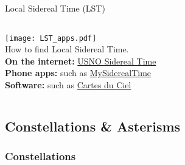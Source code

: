 
\begin{frame}{Local Sidereal Time (LST)}
  \begin{columns}[T]
    \centering
      \texttt{[image: LST\_apps.pdf]}
    \ \\[1ex]

    How to find Local Sidereal Time.\\[1.5ex]

    \textbf{On the internet:} \href{https://aa.usno.navy.mil/data/siderealtime}{USNO Sidereal Time}\\[1.5ex]

    \textbf{Phone apps:} such as \href{https://play.google.com/store/apps/details?id=com.watware.www.mysiderealtime&hl=en}{MySiderealTime}\\[1.5ex]

    \textbf{Software:} such as \href{https://www.ap-i.net/skychart/en/start}{Cartes du Ciel}
  \end{columns}

\end{frame}

\subsection{Constellations \& Asterisms}

\subsubsection{Constellations}

\begin{frame}{\insertsubsubsectionhead}
  \centering
\end{frame}


